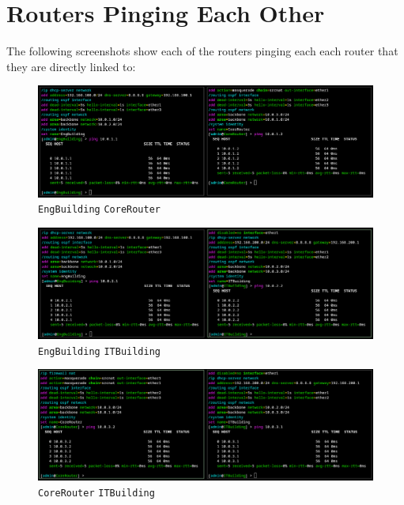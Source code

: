 \documentclass[a4paper]{article}
\begin{document}
\section{Routers Pinging Each Other}
The following screenshots show each of the routers pinging each each router that they are directly linked to:
\begin{figure}[H]
    \centering
    \includegraphics[width=\textwidth]{./images/eng-core.png}
    \caption{\texttt{EngBuilding} {\leftrightarrow} \texttt{CoreRouter}}
\end{figure}

\begin{figure}[H]
    \centering
    \includegraphics[width=\textwidth]{./images/eng-it.png}
    \caption{\texttt{EngBuilding} {\leftrightarrow} \texttt{ITBuilding}}
\end{figure}

\begin{figure}[H]
    \centering
    \includegraphics[width=\textwidth]{./images/core-it.png}
    \caption{\texttt{CoreRouter} {\leftrightarrow} \texttt{ITBuilding}}
\end{figure}
 
\end{document}
